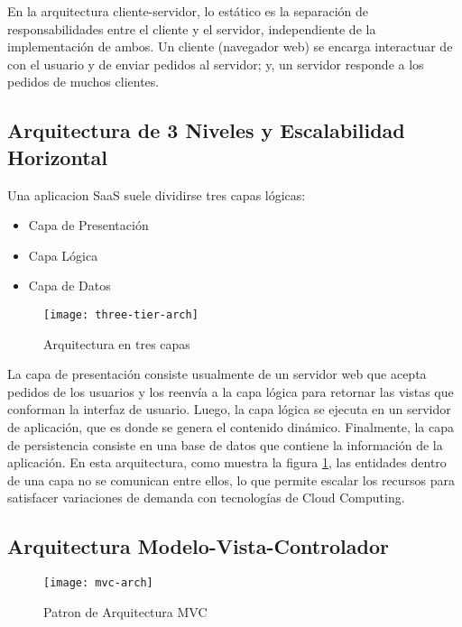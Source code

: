 En la arquitectura cliente-servidor, lo estático es la separación de responsabilidades entre el cliente y el servidor, independiente de la implementación de ambos. Un cliente (navegador web) se encarga interactuar de con el usuario y de enviar pedidos al servidor; y, un servidor responde a los pedidos de muchos clientes. 
\subsection{Arquitectura de 3 Niveles y Escalabilidad Horizontal}

Una aplicacion SaaS suele dividirse tres capas lógicas:
\begin{itemize}
    \item Capa de Presentación
    \item Capa Lógica
    \item Capa de Datos
\end{itemize}
\begin{figure}[H]
        \centering
        \texttt{[image: three-tier-arch]}
        \caption{Arquitectura en tres capas \protect\cite{Fox2013-ct}}
        \label{fig:three-tier-arch}
    \end{figure}
La capa de presentación consiste usualmente de un servidor web que acepta pedidos de los usuarios y los reenvía a la capa lógica para retornar las vistas que conforman la interfaz de usuario. Luego, la capa lógica se ejecuta en un servidor de aplicación, que es donde se genera el contenido dinámico. Finalmente, la capa de persistencia consiste en una base de datos que contiene la información de la aplicación. En esta arquitectura, como muestra la figura \ref{fig:three-tier-arch}, las entidades dentro de una capa no se comunican entre ellos, lo que permite escalar los recursos para satisfacer variaciones de demanda con tecnologías de Cloud Computing.

\subsection{Arquitectura Modelo-Vista-Controlador}

\begin{figure}[H]
        \centering
        \texttt{[image: mvc-arch]}
        \caption{Patron de Arquitectura MVC \protect\cite{Fowler2012-az}}
        \label{fig:mvc-arch}
    \end{figure}

